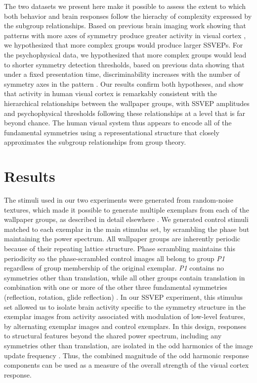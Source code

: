 \documentclass[9pt,twocolumn,twoside,lineno]{pnas-new}
\begin{document}
The two datasets we present here make it possible to assess the extent to which both behavior and brain responses follow the hierachy of complexity expressed by the subgroup relationships. Based on previous brain imaging work showing that patterns with more axes of symmetry produce greater activity in visual cortex \cite{RN1170, RN1959, RN1725, keefe_2018}, we hypothesized that more complex groups would produce larger SSVEPs. For the psychophysical data, we hypothesized that more complex groups would lead to shorter symmetry detection thresholds, based on previous data showing that under a fixed presentation time, discriminability increases with the number of symmetry axes in the pattern \cite{wagemans_1991}. Our results confirm both hypotheses, and show that activity in human visual cortex is remarkably consistent with the hierarchical relationships between the wallpaper groups, with SSVEP amplitudes and psychophysical thresholds following these relationships at a level that is far beyond chance. The human visual system thus appears to encode all of the fundamental symmetries using a representational structure that closely approximates the subgroup relationships from group theory.

\section*{Results}

The stimuli used in our two experiments were generated from random-noise textures, which made it possible to generate multiple exemplars from each of the wallpaper groups, as described in detail elsewhere \cite{RN1725}. We generated control stimuli matched to each exemplar in the main stimulus set, by scrambling the phase but maintaining the power spectrum. All wallpaper groups are inherently periodic because of their repeating lattice structure. Phase scrambling maintains this periodicity so the phase-scrambled control images all belong to group \textit{P1} regardless of group membership of the original exemplar. \textit{P1} contains no symmetries other than translation, while all other groups contain translation in combination with one or more of the other three fundamental symmetries (reflection, rotation, glide reflection) \cite{RN1425}. In our SSVEP experiment, this stimulus set allowed us to isolate brain activity specific to the symmetry structure in the exemplar images from activity associated with modulation of low-level features, by alternating exemplar images and control exemplars. In this design, responses to structural features beyond the shared power spectrum, including any symmetries other than translation, are isolated in the odd harmonics of the image update frequency \cite{RN1725,RN1540, RN1954}. Thus, the combined magnitude of the odd harmonic response components can be used as a measure of the overall strength of the visual cortex response.
\end{document}
